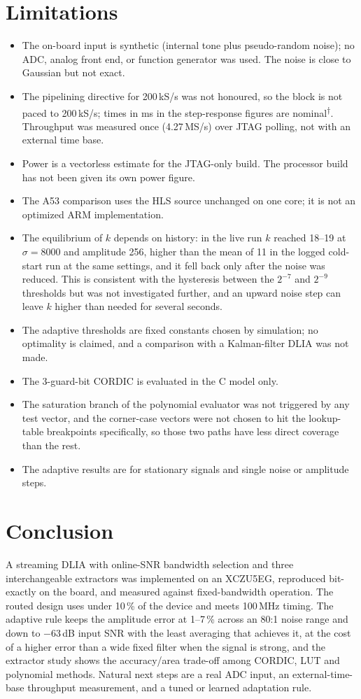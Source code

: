\documentclass[journal]{IEEEtran}
\newcommand{\nom}{\textsuperscript{$\dagger$}}
\begin{document}
\section{Limitations}
\begin{itemize}
\item The on-board input is synthetic (internal tone plus pseudo-random noise); no ADC, analog front end, or function generator was used. The noise is close to Gaussian but not exact.
\item The pipelining directive for 200\,kS/s was not honoured, so the block is not paced to 200\,kS/s; times in ms in the step-response figures are nominal\nom{}. Throughput was measured once (4.27\,MS/s) over JTAG polling, not with an external time base.
\item Power is a vectorless estimate for the JTAG-only build. The processor build has not been given its own power figure.
\item The A53 comparison uses the HLS source unchanged on one core; it is not an optimized ARM implementation.
\item The equilibrium of $k$ depends on history: in the live run $k$ reached 18--19 at $\sigma=8000$ and amplitude 256, higher than the mean of 11 in the logged cold-start run at the same settings, and it fell back only after the noise was reduced. This is consistent with the hysteresis between the $2^{-7}$ and $2^{-9}$ thresholds but was not investigated further, and an upward noise step can leave $k$ higher than needed for several seconds.
\item The adaptive thresholds are fixed constants chosen by simulation; no optimality is claimed, and a comparison with a Kalman-filter DLIA \cite{chen} was not made.
\item The 3-guard-bit CORDIC is evaluated in the C model only.
\item The saturation branch of the polynomial evaluator was not triggered by any test vector, and the corner-case vectors were not chosen to hit the lookup-table breakpoints specifically, so those two paths have less direct coverage than the rest.
\item The adaptive results are for stationary signals and single noise or amplitude steps.
\end{itemize}

\section{Conclusion}
A streaming DLIA with online-SNR bandwidth selection and three interchangeable extractors was implemented on an XCZU5EG, reproduced bit-exactly on the board, and measured against fixed-bandwidth operation. The routed design uses under 10\,\% of the device and meets 100\,MHz timing. The adaptive rule keeps the amplitude error at 1--7\,\% across an 80:1 noise range and down to $-63$\,dB input SNR with the least averaging that achieves it, at the cost of a higher error than a wide fixed filter when the signal is strong, and the extractor study shows the accuracy/area trade-off among CORDIC, LUT and polynomial methods. Natural next steps are a real ADC input, an external-time-base throughput measurement, and a tuned or learned adaptation rule.
\end{document}
